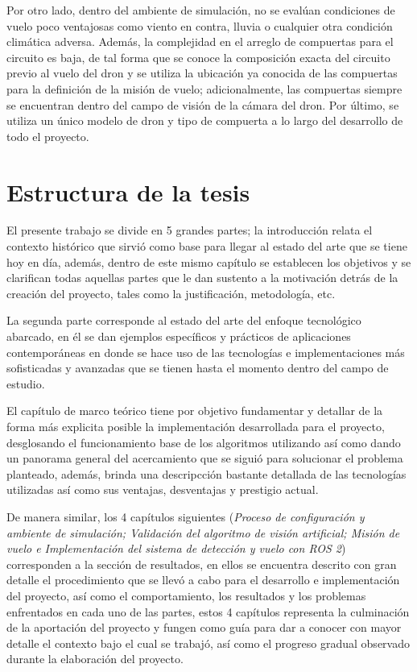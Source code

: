 Por otro lado, dentro del ambiente de simulación, no se evalúan condiciones de vuelo poco ventajosas como viento en contra, lluvia o cualquier otra condición climática adversa. Además, la complejidad en el arreglo de compuertas para el circuito es baja, de tal forma que se conoce la composición exacta del circuito previo al vuelo del dron y se utiliza la ubicación ya conocida de las compuertas para la definición de la misión de vuelo; adicionalmente, las compuertas siempre se encuentran dentro del campo de visión de la cámara del dron. Por último, se utiliza un único modelo de dron y tipo de compuerta a lo largo del desarrollo de todo el proyecto.


\section{Estructura de la tesis}
El presente trabajo se divide en 5 grandes partes; la introducción relata el contexto histórico que sirvió como base para llegar al estado del arte que se tiene hoy en día, además, dentro de este mismo capítulo se establecen los objetivos y se clarifican todas aquellas partes que le dan sustento a la motivación detrás de la creación del proyecto, tales como la justificación, metodología, etc.

La segunda parte corresponde al estado del arte del enfoque tecnológico abarcado, en él se dan ejemplos específicos y prácticos de aplicaciones contemporáneas en donde se hace uso de las tecnologías e implementaciones más sofisticadas y avanzadas que se tienen hasta el momento dentro del campo de estudio. 

El capítulo de marco teórico tiene por objetivo fundamentar y detallar de la forma más explicita posible la implementación desarrollada para el proyecto, desglosando el funcionamiento base de los algoritmos utilizando así como dando un panorama general del acercamiento que se siguió para solucionar el problema planteado, además, brinda una descripcción bastante detallada de las tecnologías utilizadas así como sus ventajas, desventajas y prestigio actual.

De manera similar, los 4 capítulos siguientes (\textit{Proceso de configuración y ambiente de simulación; Validación del algoritmo de visión artificial; Misión de vuelo e Implementación del sistema de detección y vuelo con ROS 2}) corresponden a la sección de resultados, en ellos se encuentra descrito con gran detalle el procedimiento que se llevó a cabo para el desarrollo e implementación del proyecto, así como el comportamiento, los resultados y los problemas enfrentados en cada uno de las partes, estos 4 capítulos representa la culminación de la aportación del proyecto y fungen como guía para dar a conocer con mayor detalle el contexto bajo el cual se trabajó, así como el progreso gradual observado durante la elaboración del proyecto.

